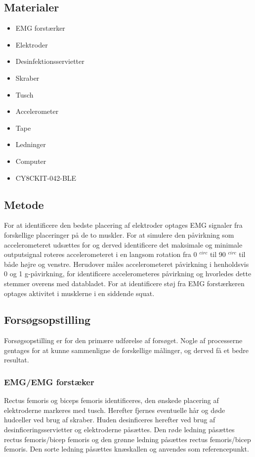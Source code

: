 \subsection{Materialer}  
\begin{itemize}
\item EMG forstærker
\item Elektroder
\item Desinfektionsservietter
\item Skraber
\item Tusch 

\item Accelerometer
\item Tape
\item Ledninger

\item Computer
\item CY8CKIT-042-BLE
\end{itemize}

\subsection{Metode}
\begin{itemize}
For at identificere den bedste placering af elektroder optages EMG signaler fra forskellige placeringer på de to muskler. 
For at simulere den påvirkning som accelerometeret udsættes for og derved identificere det maksimale og minimale outputsignal roteres accelerometeret i en langsom rotation fra 0 $^{circ}$ til 90 $^{circ}$  til både højre og venstre. Herudover måles accelerometeret påvirkning i henholdsvis 0 og 1 g-påvirkning, for identificere accelerometeres påvirkning og hvorledes dette stemmer overens med databladet. 
For at identificere støj fra EMG forstærkeren optages aktivitet i musklerne i en siddende squat.
 
\end{itemize}
\subsection{Forsøgsopstilling}
Forsøgsopstilling er for den primære udførelse af forsøget. Nogle af processerne gentages for at kunne sammenligne de forskellige målinger, og derved få et bedre resultat.

\subsubsection{EMG/EMG forstæker}
Rectus femoris og biceps femoris identificeres, den ønskede placering af elektroderne markeres med tusch. Herefter fjernes eventuelle hår og døde hudceller ved brug af skraber. Huden desinficeres herefter ved brug af desinficeringsservietter og elektroderne påsættes. Den røde ledning påsættes rectus femoris/bicep femoris og den grønne ledning påsættes rectus femoris/bicep femoris. Den sorte ledning påsættes knæskallen og anvendes som referencepunkt.


